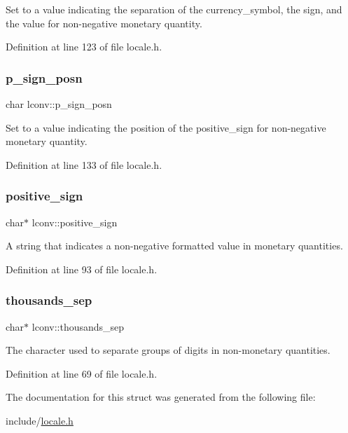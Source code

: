 Set to a value indicating the separation of the currency\+\_\+symbol, the sign, and the value for non-\/negative monetary quantity. 



Definition at line 123 of file locale.\+h.

\mbox{\label{structlconv_a1fdead36abe5c2ca673142ea401478e8}} 
\subsubsection{\texorpdfstring{p\_sign\_posn}{p\_sign\_posn}}
{\footnotesize\ttfamily char lconv\+::p\+\_\+sign\+\_\+posn}



Set to a value indicating the position of the positive\+\_\+sign for non-\/negative monetary quantity. 



Definition at line 133 of file locale.\+h.

\mbox{\label{structlconv_a74bf5f6f32624be629f7de0dabd58a96}} 
\subsubsection{\texorpdfstring{positive\_sign}{positive\_sign}}
{\footnotesize\ttfamily char$\ast$ lconv\+::positive\+\_\+sign}



A string that indicates a non-\/negative formatted value in monetary quantities. 



Definition at line 93 of file locale.\+h.

\mbox{\label{structlconv_aede8dfaac91d7b4e6b7fb0d96184d74d}} 
\subsubsection{\texorpdfstring{thousands\_sep}{thousands\_sep}}
{\footnotesize\ttfamily char$\ast$ lconv\+::thousands\+\_\+sep}



The character used to separate groups of digits in non-\/monetary quantities. 



Definition at line 69 of file locale.\+h.



The documentation for this struct was generated from the following file\+:\begin{DoxyCompactItemize}
\item 
include/\mbox{\hyperlink{locale_8h}{locale.\+h}}\end{DoxyCompactItemize}
